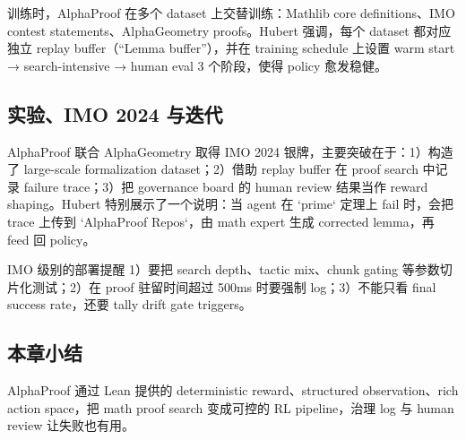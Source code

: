 训练时，AlphaProof 在多个 dataset 上交替训练：Mathlib core definitions、IMO contest statements、AlphaGeometry proofs。Hubert 强调，每个 dataset 都对应独立 replay buffer（“Lemma buffer”），并在 training schedule 上设置 warm start → search-intensive → human eval 3 个阶段，使得 policy 愈发稳健。

\subsection{实验、IMO 2024 与迭代}
AlphaProof 联合 AlphaGeometry 取得 IMO 2024 银牌，主要突破在于：1）构造了 large-scale formalization dataset；2）借助 replay buffer 在 proof search 中记录 failure trace；3）把 governance board 的 human review 结果当作 reward shaping。Hubert 特别展示了一个说明：当 agent 在 `prime` 定理上 fail 时，会把 trace 上传到 `AlphaProof Repos`，由 math expert 生成 corrected lemma，再 feed 回 policy。
\begin{warningbox}{IMO 级别的部署提醒}
1）要把 search depth、tactic mix、chunk gating 等参数切片化测试；2）在 proof 驻留时间超过 500ms 时要强制 log；3）不能只看 final success rate，还要 tally drift gate triggers。
\end{warningbox}

\subsection{本章小结}
AlphaProof 通过 Lean 提供的 deterministic reward、structured observation、rich action space，把 math proof search 变成可控的 RL pipeline，治理 log 与 human review 让失败也有用。
\newpage


